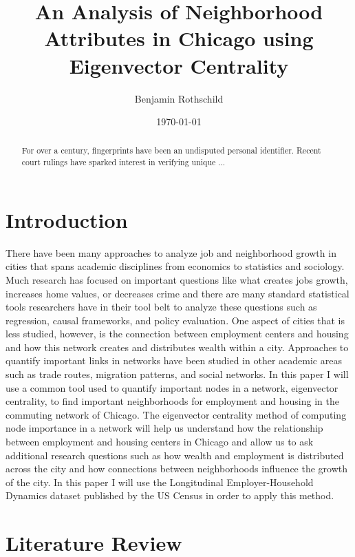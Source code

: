 \documentclass{article}
\title{An Analysis of Neighborhood Attributes in Chicago using Eigenvector Centrality}
\author{Benjamin Rothschild}
\date{\today}
\theoremstyle{definition}
\theoremstyle{remark}
\begin{document}
\begin{titlepage}
\maketitle
\begin{abstract}
For over a century, fingerprints have been an undisputed personal identifier.  Recent court rulings have sparked interest in verifying unique ...
\end{abstract}


\thispagestyle{empty}

\end{titlepage}

\section{Introduction}
 
There have been many approaches to analyze job and neighborhood growth in cities that spans academic disciplines from economics to statistics and sociology.  Much research has focused on important questions like what creates jobs growth, increases home values, or decreases crime and there are many standard statistical tools researchers have in their tool belt to analyze these questions such as regression, causal frameworks, and policy evaluation.  One aspect of cities that is less studied, however, is the connection between employment centers and housing and how this network creates and distributes wealth within a city.  Approaches to quantify important links in networks have been studied in other academic areas such as trade routes, migration patterns, and social networks.  In this paper I will use a common tool used to quantify important nodes in a network, eigenvector centrality, to find important neighborhoods for employment and housing in the commuting network of Chicago.  The eigenvector centrality method of computing node importance in a network will help us understand how the relationship between employment and housing centers in Chicago and allow us to ask additional research questions such as how wealth and employment is distributed across the city and how connections between neighborhoods influence the growth of the city.  In this paper I will use the Longitudinal Employer-Household Dynamics dataset published by the US Census in order to apply this method.

\section{Literature Review}
\end{document}
